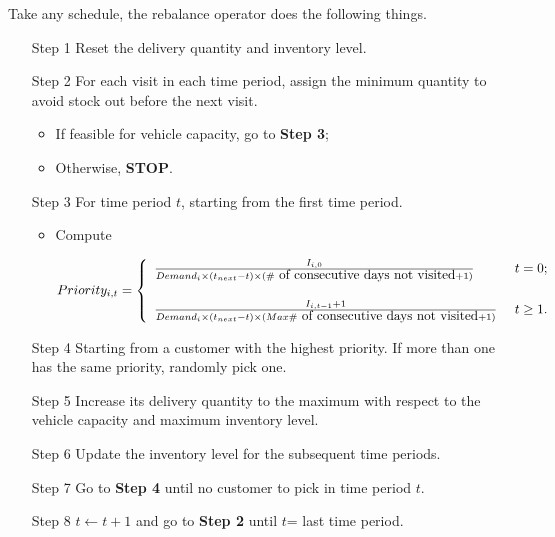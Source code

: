 \documentclass{article}
\begin{document}
Take any schedule, the rebalance operator does the following things.
\begin{itemize} 
    \item [Step 1] Reset the delivery quantity and inventory level.
    \item [Step 2] For each visit in each time period, assign the minimum quantity to avoid stock out before the next visit. 
                   \begin{itemize}
                        \item If feasible for vehicle capacity, go to \textbf{Step 3};
                        \item Otherwise, \textbf{STOP}.
                   \end{itemize}
    \item [Step 3] For time period $t$, starting from the first time period.
            \begin{itemize}
            \item Compute 
            
            \[
                Priority_{i,t}= \left\{ 
                \begin{array}{ll}
  		        \frac{I_{i,0}}  {Demand_i\times(t_{next} - t)\times (\#\mbox{ of consecutive days not visited}+1)} & \mbox{ $t =0$};\vspace{0.5cm}\\
            
		          \frac{I_{i,t-1}+1}  {Demand_i\times(t_{next} - t)\times (Max\#\mbox{ of consecutive days not visited}+1)} & \mbox{ $t\geq 1$}. 
  		    \end{array}\right. \\ 
            \]
            
          
        
            
        \end{itemize} 
    \item [Step 4] Starting from a customer with the highest priority. If more than one has the same priority, randomly pick one.
    \item [Step 5] Increase its delivery quantity to the maximum with respect to the vehicle capacity and maximum inventory level.
    \item [Step 6] Update the inventory level for the subsequent time periods.
    \item [Step 7] Go to \textbf{Step 4} until no customer to pick in time period $t$.
    \item [Step 8] $t\gets t+1$ and go to \textbf{Step 2} until $t$= last time period.
\end{itemize}
\end{document}
